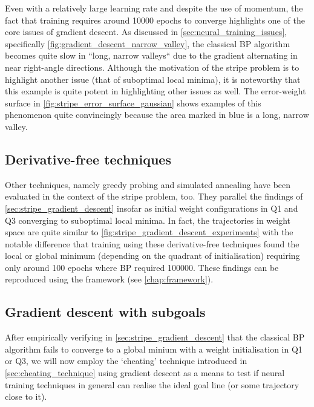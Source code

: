 Even with a relatively large learning rate and despite the use of momentum, the fact that training requires around 10000 epochs to converge highlights one of the core issues of gradient descent.
As discussed in \ref{sec:neural_training_issues}, specifically \ref{fig:gradient_descent_narrow_valley}, the classical BP algorithm becomes quite slow in ``long, narrow valleys`` \cite[p. 421]{press1992} due to the gradient alternating in near right-angle directions.
Although the motivation of the stripe problem is to highlight another issue (that of suboptimal local minima), it is noteworthy that this example is quite potent in highlighting other issues as well.
The error-weight surface in \ref{fig:stripe_error_surface_gaussian} shows examples of this phenomenon quite convincingly because the area marked in blue is a long, narrow valley.

\subsection{Derivative-free techniques}
Other techniques, namely greedy probing and simulated annealing have been evaluated in the context of the stripe problem, too.
They parallel the findings of \ref{sec:stripe_gradient_descent} insofar as initial weight configurations in Q1 and Q3 converging to suboptimal local minima.
In fact, the trajectories in weight space are quite similar to \ref{fig:stripe_gradient_descent_experiments} with the notable difference that training using these derivative-free techniques found the local or global minimum (depending on the quadrant of initialisation) requiring only around 100 epochs where BP required 100000. 
These findings can be reproduced using the framework (see \ref{chap:framework}).

\subsection{Gradient descent with subgoals}
\label{sec:stripe_gradient_descent_subgoals}
After empirically verifying in \ref{sec:stripe_gradient_descent} that the classical BP algorithm fails to converge to a global minium with a weight initialisation in Q1 or Q3, we will now employ the `cheating' technique introduced in \ref{sec:cheating_technique} using gradient descent as a means to test if neural training techniques in general can realise the ideal goal line (or some trajectory close to it).

